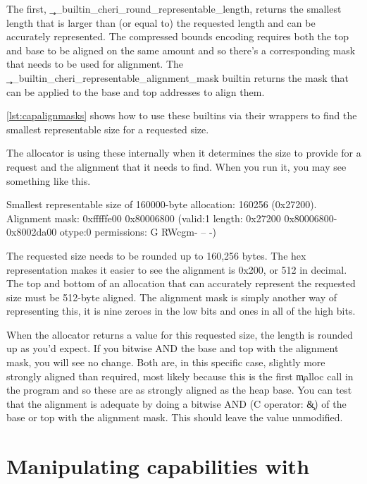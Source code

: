 {{{{{{{{The first, \c{__builtin_cheri_round_representable_length}, returns the smallest length that is larger than (or equal to) the requested length and can be accurately represented.
The compressed bounds encoding requires both the top and base to be aligned on the same amount and so there's a corresponding mask that needs to be used for alignment.
The \c{__builtin_cheri_representable_alignment_mask} builtin returns the mask that can be applied to the base and top addresses to align them.

\ref{lst:capalignmasks} shows how to use these builtins via their wrappers to find the smallest representable size for a requested size.

\codelisting[filename=examples/bounds_lengths/example.c,marker=representable_range,label=lst:capalignmasks,caption="Rounding up sizes for representable allocations."]{}

The allocator is using these internally when it determines the size to provide for a request and the alignment that it needs to find.
When you run it, you may see something like this.

\begin{console}
Smallest representable size of 160000-byte allocation: 160256 (0x27200). Alignment mask: 0xfffffe00
0x80006800 (valid:1 length: 0x27200 0x80006800-0x8002da00 otype:0 permissions: G RWcgm- -- -)
\end{console}

The requested size needs to be rounded up to 160,256 bytes.
The hex representation makes it easier to see the alignment is 0x200, or 512 in decimal.
The top and bottom of an allocation that can accurately represent the requested size must be 512-byte aligned.
The alignment mask is simply another way of representing this, it is nine zeroes in the low bits and ones in all of the high bits.

When the allocator returns a value for this requested size, the length is rounded up as you'd expect.
If you bitwise AND the base and top with the alignment mask, you will see no change.
Both are, in this specific case, slightly more strongly aligned than required, most likely because this is the first \c{malloc} call in the program and so these are as strongly aligned as the heap base.
You can test that the alignment is adequate by doing a bitwise AND (C operator: \c{&}) of the base or top with the alignment mask.
This should leave the value unmodified.

\section[label=cheri_capability_cpp]{Manipulating capabilities with }

}}}}}}}}
